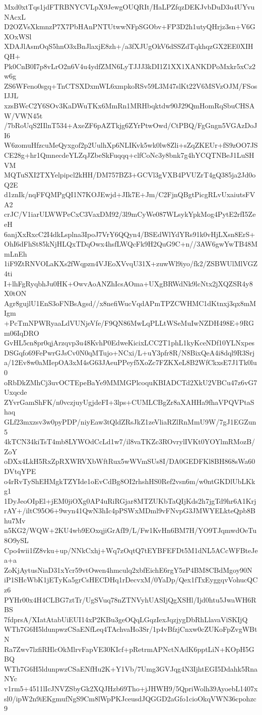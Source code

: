 Mxd0xtTqs1jdFTRBNYCVLpX9JewgOUQRIt/HaLPZfqzDEKJvbDuD3u4UYvuNAcxL
D2OZVsXkmnzP7X7PbHAnPNTUtwwNFpSGObv+FP3D2h1utyQHrjz3sn+V6GXOxWSl
XDAJlAsmOqS5hnO3xBnJlaxjE8zh+/a3fXJUgOkV6dSSZdTqkhqzGX2EE0XIHQH+
Pk0CnB0I7p8vLrO2n6V4u4ydfZMN6LyTJJJ3kDI1Z1XX1XANKDPoMxkr5xCz2w6g
ZS6WFeno0sgq+TnCTSXDxmWL6xmpkoRSv59L3M47slKt22V6MSVzOJM/FSosIJJL
xzsBWcC2Y6SOv3KaDWuTKx6MmRn1MRHbqktdw90J29QmHomRqSbuCHSAW/VWN45t
/7bRoUqS2IIlnT534+AxeZF6pAZTkjg6ZYrPtwOwd/CtPBQ/FgGngn5VGAzDoJI6
W6zomuHfzcuMeQyxgof2p2UulhXp6NLIKvk5wk0lw8Zli+sZqZKEUr+fS9zOO7JS
CE28g+hr1QmnecdeYLZqJZbeSkFuqqq+clfCoNc3y8bnk7g4hYCQTNBeJ1LuSHVM
MQTuSXI2TXYelpipcl2kHH/DM757BZ3+GCVl3gVXB4PVUZrT4gQ385ja2Jd0oQ2E
d1znIk/nqFFQMPgQI1N7KOJEwjd+JIk7E+Jm/C2FjnQBgtPicgRLvUxaiutsFVA2
crJC/V1iarULWWPeCxC3VaxDM92/3l9mCyWe087WLsykYpkMog4PytE2rfI5ZeeH
6anjXxRxcC2I4dkLsplna3IpoJ7VrY6QQyn4/BSEdWlYdYRs91k0vHjLXsn8ErS+
OhI6dFhSt85kNjHLQxTDqOwx4hsfLWQcFk9H2QuG9C+n//3AW6gwYwTB48MmLnEh
1iF9ZtRNVOLaKXs2fWqpzn4VJEoXVvqU31X+zuwWl9iyo/fk2/ZSBWUlMlVGZ4ti
I+lhFgRyqbhJu0HK+OwvAoANZhIcsAOma+UXgBRWdNk9lcNtx2jXQZSR4y8X0tON
Agr8gujlU1EnS3oFNBsAgsd//x8nefiWucVqdAPmTPZCWHMC1dKtnxj3qx8mMIgm
+PcTmNPWRyaaLdVUNjeVfe/F9QN86MwLqPLLtWSeMuIwNZDH498E+9RGm06IqDRO
GvHL5cn8pr0qjArzqvp3u48KvhP0EdweKicixLCC2T1phL1kyKceNDf10YLNxpes
DSGqfo69FePwrGJsCv0N0qMTujo+NCxi/L+uY3pfr8R/N8BixQeA4i8dql9R3Srj
a/12Ev8w0aMIepOA3xM4sG63JAeuPPeyf5XoZc7FZKXeL8B2WfCkxsE7J1Tk0lu0
oRbDkZMhCj3uvOCTEpeBaYe9MMMGPlcoquKBIADCTd2XkU2VBCu47z6vG7Uxqcde
ZYvrGamShFK/n0vczjuyUgjdeFI+3lps+CUMLCBgZr8aXAHHa9fhaVPQVPtaShaq
GLf23mxzsv3w0pyPDP/niyEaw3tQldZRsJkZ1zeVliaRZlRnMmU9W/7gJ1EGZun5
4kTCN34kiTsT4mb8LYWOdCcLd1w7/il8vaTKZc3ROvrylIVKt0YOYlmRMozB/ZoY
oDXx4LkH5RxZpRXWRVXbWftRux5wWVmSUs8I/DA0GEDFKl8BH868sWa60DVtqYPE
o4rRvTyShEHMgkTZYIde1oEvCdBg8OI2rhshHS0Ref2vsn6m/w0ntGKDlUbLKkg1
1DyJeoOIpEl+jEM0jiOXg0AP4uRiRGjar8MTZUKbTaQIjKds2h7jgTd9hr6A1Krj
rAY+/iltC95O6+9wyn41QwN3hIc4pPSWxMDml9vFNvpG3JMWYELkteQpb8Bhu7Mv
n5KG2/WQW+2KU4wb9EOxqjiGrAfI9/L/Fw1KvHn6BM7H/YO9TJqmwdOeTu8O9ySL
Cpo4wii1fZ8vku+up/NNkCxhj+Wq7zOqtQ7tEYBFEFDt5M1dNL5ACcWFBteJea+a
ZoKjAytusNiaD31xYcr59vtOwen4hmculq2xbfEichE6rgY5zP4BM8CBdMgoy90N
iP1SHcWbK1jETyKa5grCsHECDHq1rDecvxM/0YaDp/Qex1fTxEyggqvVohucQCz6
PYHr00x4H4CLBG7ztTr/UgSVuq78nZTNVyhUASIjQgXSHl/Ijd0htu5JwaWH6RBS
7fdprsA/XIatAtabUiEUI14xP2KBu3geOQqLGqzIexJqzjygDbRhLlavaViSKIjQ
WTh7G6H5ldunpwzCSaENfLeq4TAchvaHo3Sr/1p4vBfzjCnxw0cZUKoFpZvgWBtN
Ra7Zwv7lzfiRHlcOkMlrvFapVE30KIcf+pRetrmAPNctNAdK6pptLiN+KOpH5GBQ
WTh7G6H5ldunpwzCSaENfHu2K+Y1Vb/7Umg3GVJqg4N3IjhtEGI5Ddahk5RnaNYc
v1rm5+4511lIcJNVZSbyGk2XQJHzb69Tho+jJHWH9/5QpriWolh39AyoebL1407x
sl0/ipW2n9iEKgmufNgS9Cm8lWpPKJceusdJQGGD2aGfo1cioOkqVWN36cpohzc9
